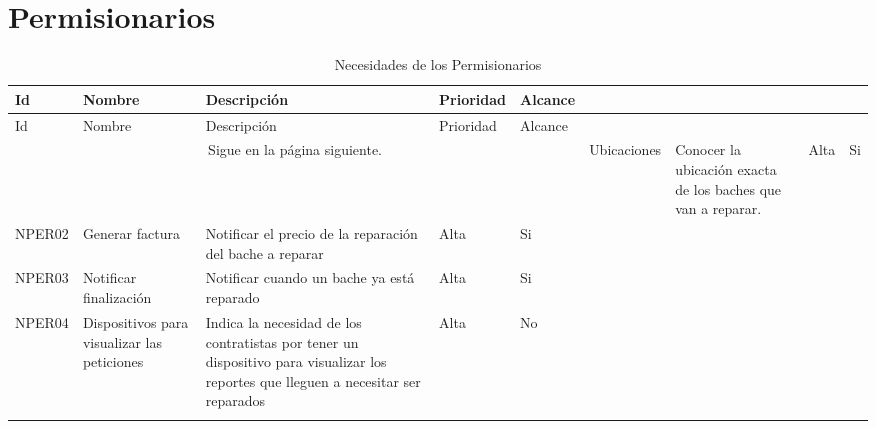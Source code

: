 \section {Permisionarios}
\begin{longtable}{|m{1.5cm}|m{3cm}|m{5cm}|m{2cm}| m{2cm}|}
        \rowcolor[HTML]{3531FF} 
        {\color[HTML]{FFFFFF} Id} &{\color[HTML]{FFFFFF}Nombre} & {\color[HTML]{FFFFFF} Descripción} & {\color[HTML]{FFFFFF}Prioridad} & {\color[HTML]{FFFFFF}Alcance}  \\
        \hline
        \endfirsthead
        \hline
        \rowcolor[HTML]{3531FF} 
        {\color[HTML]{FFFFFF} Id} &{\color[HTML]{FFFFFF}Nombre} & {\color[HTML]{FFFFFF} Descripción} & {\color[HTML]{FFFFFF}Prioridad} & {\color[HTML]{FFFFFF}Alcance}  \\
        \hline 
        \endhead
        \multicolumn{5}{c}{Sigue en la página siguiente.}
        \endfoot
        \endlastfoot
        NPER01 & Ubicaciones & Conocer la ubicación exacta de los baches que van a reparar. & Alta  & Si \\ \hline
        
        NPER02 & Generar factura & Notificar el precio de la reparación del bache a reparar & Alta  & Si \\ \hline
        
        NPER03 & Notificar finalización & Notificar cuando un bache ya está reparado & Alta  & Si \\ \hline
        
        NPER04 & Dispositivos para visualizar las peticiones & Indica la necesidad de los contratistas por tener un dispositivo para visualizar los reportes que lleguen a necesitar ser reparados & Alta & No \\ \hline
        
    \caption{Necesidades de los Permisionarios}
    \label{tab:PERs}
\end{longtable}

